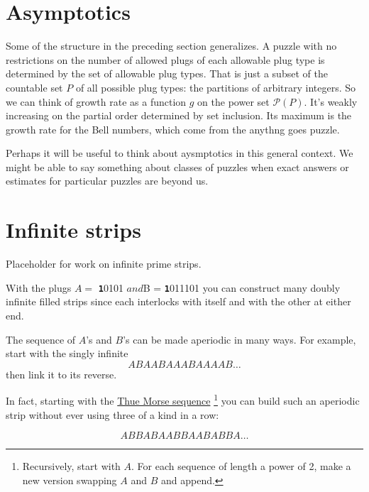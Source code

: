 \documentclass[10pt]{article}
\numberwithin{equation}{section}
\newenvironment{anote}
               {{\textcolor{blue}{Note:}}
                 \itshape
               }
               {}
\newcommand{\plug}[1]{%
\mbox{{\textbf\texttt #1}}
}
\begin{document}
\section{Asymptotics}

Some of the structure in the preceding section generalizes. A puzzle with no restrictions on the number of allowed plugs of each allowable plug type is determined by the set  of allowable plug types. That is just a subset of the countable set $P$ of all possible plug types: the partitions of arbitrary integers. So we can think of growth rate as a function $g$ on the power set $\mathcal{P}(P)$. It's weakly increasing on the partial order determined by set inclusion. Its maximum is the growth rate for the Bell numbers, which come from the anythng goes puzzle.

\begin{anote}
Perhaps it will be useful to think about aysmptotics in this general context. We might be able to say something about classes of puzzles when exact answers or estimates for particular puzzles are beyond us.
\end{anote}
\section{Infinite strips}

\begin{anote}
Placeholder for work on infinite prime strips.
\end{anote}


With the plugs $A = $\plug{10101}$ and $B = \plug{1011101} you can construct many doubly infinite filled strips since each interlocks with itself and with the other at either end. 

The sequence of $A$'s and $B$'s can be made aperiodic in many ways. For example, start with the singly infinite
\begin{equation}
    ABAABAAABAAAAB\ldots
\end{equation}
then link it to its reverse.

In fact, starting with the \href{https://en.wikipedia.org/wiki/Thue-Morse_sequence}{Thue Morse sequence}
\footnote{ Recursively, start with $A$. For each sequence of length a power of 2, make a new version swapping $A$ and $B$ and append.}
you can build such an aperiodic strip without ever using three of a kind in a row:  

\begin{equation*}
  A B  BA BAAB BAABABBA \ldots  
\end{equation*}
\end{document}
